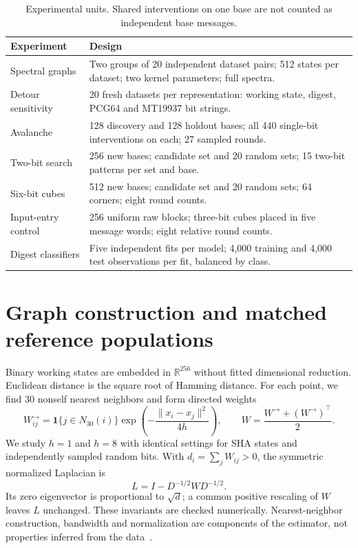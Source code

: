 \documentclass[11pt]{article}
\begin{document}
\begin{table}[ht]
\centering\small
\caption{Experimental units. Shared interventions on one base are not counted as independent base messages.}
\begin{tabular}{@{}p{.25\linewidth}p{.66\linewidth}@{}}\toprule
Experiment & Design \\\midrule
Spectral graphs & Two groups of 20 independent dataset pairs; 512 states per dataset; two kernel parameters; full spectra. \\
Detour sensitivity & 20 fresh datasets per representation: working state, digest, PCG64 and MT19937 bit strings. \\
Avalanche & 128 discovery and 128 holdout bases; all 440 single-bit interventions on each; 27 sampled rounds. \\
Two-bit search & 256 new bases; candidate set and 20 random sets; 15 two-bit patterns per set and base. \\
Six-bit cubes & 512 new bases; candidate set and 20 random sets; 64 corners; eight round counts. \\
Input-entry control & 256 uniform raw blocks; three-bit cubes placed in five message words; eight relative round counts. \\
Digest classifiers & Five independent fits per model; 4,000 training and 4,000 test observations per fit, balanced by class. \\\bottomrule
\end{tabular}
\end{table}

\section{Graph construction and matched reference populations}
Binary working states are embedded in $\mathbb R^{256}$ without fitted dimensional reduction. Euclidean distance is the square root of Hamming distance. For each point, we find 30 nonself nearest neighbors and form directed weights
\begin{equation}
 W^{\rightarrow}_{ij}=\mathbf 1\{j\in N_{30}(i)\}
 \exp\!\left(-\frac{\|x_i-x_j\|^2}{4h}\right),\qquad
 W=\frac{W^{\rightarrow}+(W^{\rightarrow})^\top}{2}.
\end{equation}
We study $h=1$ and $h=8$ with identical settings for SHA states and independently sampled random bits. With $d_i=\sum_jW_{ij}>0$, the symmetric normalized Laplacian is
\begin{equation}L=I-D^{-1/2}WD^{-1/2}.\end{equation}
Its zero eigenvector is proportional to $\sqrt d$; a common positive rescaling of $W$ leaves $L$ unchanged. These invariants are checked numerically. Nearest-neighbor construction, bandwidth and normalization are components of the estimator, not properties inferred from the data~\cite{luxburg}.
\end{document}
